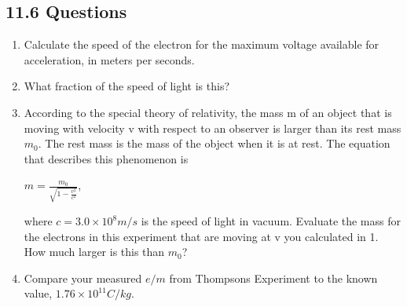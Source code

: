 \documentclass{article}
\def\F#1{\(#1\)}
\begin{document}
\subsection*{11.6 Questions}
\begin{enumerate}
  \item Calculate the speed of the electron for the maximum voltage available for acceleration, in meters per seconds.
  \item What fraction of the speed of light is this?
  \item According to the special theory of relativity, the mass m of an object that is moving with velocity v with respect to an observer is larger than its rest mass \F{m_0}. The rest mass is the mass of the object when it is at rest. The equation that describes this phenomenon is \begin{center}\F{m=\frac{m_0}{\sqrt{1-\frac{v^2}{c^2}}}},\end{center} where \F{c=3.0\times10^8m/s} is the speed of light in vacuum. Evaluate the mass for the electrons in this experiment that are moving at v you calculated in 1. How much larger is this than \F{m_0}?
  \item Compare your measured \F{e/m} from Thompsons Experiment to the known value, \F{1.76\times10^{11}C/kg}.
\end{enumerate}
\end{document}
